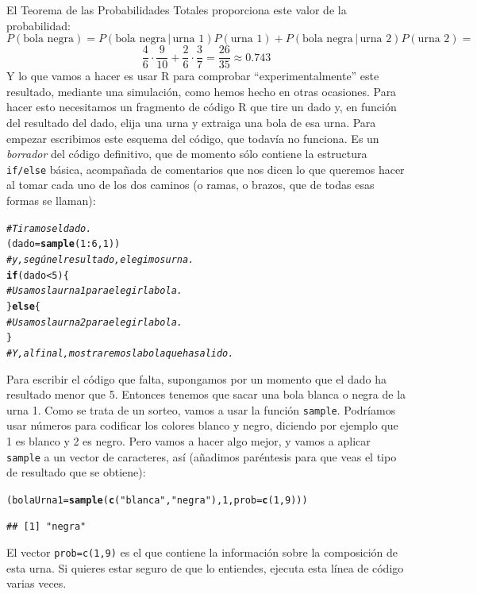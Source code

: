 \documentclass[10pt,a4paper]{article}\usepackage[]{graphicx}\usepackage[]{color}
\makeatletter
\newcommand{\hlnum}[1]{\textcolor[rgb]{0.686,0.059,0.569}{#1}}%
\newcommand{\hlstr}[1]{\textcolor[rgb]{0.192,0.494,0.8}{#1}}%
\newcommand{\hlcom}[1]{\textcolor[rgb]{0.678,0.584,0.686}{\textit{#1}}}%
\newcommand{\hlopt}[1]{\textcolor[rgb]{0,0,0}{#1}}%
\newcommand{\hlstd}[1]{\textcolor[rgb]{0.345,0.345,0.345}{#1}}%
\newcommand{\hlkwa}[1]{\textcolor[rgb]{0.161,0.373,0.58}{\textbf{#1}}}%
\newcommand{\hlkwb}[1]{\textcolor[rgb]{0.69,0.353,0.396}{#1}}%
\newcommand{\hlkwc}[1]{\textcolor[rgb]{0.333,0.667,0.333}{#1}}%
\newcommand{\hlkwd}[1]{\textcolor[rgb]{0.737,0.353,0.396}{\textbf{#1}}}%
\newenvironment{kframe}{%
 \def\at@end@of@kframe{}%
 \ifinner\ifhmode%
  \def\at@end@of@kframe{\end{minipage}}%
  \begin{minipage}{\columnwidth}%
 \fi\fi%
 \def\FrameCommand##1{\hskip\@totalleftmargin \hskip-\fboxsep
 \colorbox{shadecolor}{##1}\hskip-\fboxsep
     \hskip-\linewidth \hskip-\@totalleftmargin \hskip\columnwidth}%
 \MakeFramed {\advance\hsize-\width
   \@totalleftmargin\z@ \linewidth\hsize
   \@setminipage}}%
 {\par\unskip\endMakeFramed%
 \at@end@of@kframe}
\newenvironment{knitrout}{}{} %
\newcounter {cont01}
\makeatother
\begin{document}
El Teorema de las Probabilidades Totales proporciona este valor de la probabilidad:
\[P(\mbox{bola negra})=P(\mbox{bola negra}\,|\,\mbox{urna 1})P(\mbox{urna 1})+P(\mbox{bola negra}\,|\,\mbox{urna 2})P(\mbox{urna 2})=\]
\[\dfrac{4}{6}\cdot\dfrac{9}{10}+\dfrac{2}{6}\cdot\dfrac{3}{7}=\dfrac{26}{35}\approx 0.743\]
Y lo que vamos a hacer es usar R para comprobar ``experimentalmente'' este resultado, mediante una simulación, como hemos hecho en otras ocasiones. Para hacer esto necesitamos un fragmento de código R que tire un dado y, en función del resultado del dado, elija una urna y extraiga una bola de esa urna. Para empezar escribimos este esquema del código, que todavía no funciona. Es un {\em borrador} del código definitivo, que de momento sólo contiene la estructura {\tt if/else} básica, acompañada de comentarios que nos dicen lo que queremos hacer al tomar cada uno de los dos caminos (o ramas, o brazos, que de todas esas formas se llaman):
\begin{knitrout}
\color{fgcolor}\begin{kframe}
\begin{alltt}
    \hlcom{# Tiramos el dado.}
    \hlstd{(dado} \hlkwb{=} \hlkwd{sample}\hlstd{(}\hlnum{1}\hlopt{:}\hlnum{6}\hlstd{,}\hlnum{1}\hlstd{))}
    \hlcom{# y, según el resultado, elegimos urna.}
    \hlkwa{if}\hlstd{(dado} \hlopt{<} \hlnum{5}\hlstd{)\{}
        \hlcom{# Usamos la urna 1 para elegir la bola.}
    \hlstd{\}} \hlkwa{else} \hlstd{\{}
        \hlcom{# Usamos la urna 2 para elegir la bola.}
    \hlstd{\}}
    \hlcom{# Y, al final, mostraremos la bola que ha salido.}
\end{alltt}
\end{kframe}
\end{knitrout}
Para escribir el código que falta, supongamos por un momento que el dado ha resultado menor que 5. Entonces tenemos que sacar una bola blanca o negra de la urna 1. Como se trata de un sorteo, vamos a usar la función {\tt sample}. Podríamos usar números para codificar los colores blanco y negro, diciendo por ejemplo que 1 es blanco y 2 es negro. Pero vamos a hacer algo mejor, y vamos a aplicar {\tt sample} a un vector de caracteres, así (añadimos paréntesis para que veas el tipo de resultado que se obtiene):
\begin{knitrout}
\color{fgcolor}\begin{kframe}
\begin{alltt}
\hlstd{(bolaUrna1} \hlkwb{=} \hlkwd{sample}\hlstd{(} \hlkwd{c}\hlstd{(}\hlstr{"blanca"}\hlstd{,}\hlstr{"negra"}\hlstd{),} \hlnum{1}\hlstd{,} \hlkwc{prob}\hlstd{=}\hlkwd{c}\hlstd{(}\hlnum{1}\hlstd{,}\hlnum{9}\hlstd{) ))}
\end{alltt}
\begin{verbatim}
## [1] "negra"
\end{verbatim}
\end{kframe}
\end{knitrout}
El vector {\tt prob=c(1,9)} es el que contiene la información sobre la composición de esta urna. Si quieres estar seguro de que lo entiendes,  ejecuta esta línea de código varias veces.
\end{document}
